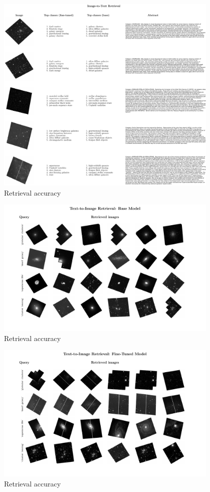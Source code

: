 \documentclass[10pt]{article} %
\begin{document}
\begin{figure}[!h]
\includegraphics[width=0.95\textwidth]{plots/itt.pdf}
\caption{Retrieval accuracy}
\label{fig:itt}
\end{figure}

\begin{figure}[!h]
\includegraphics[width=0.95\textwidth]{plots/tti_base.pdf}
\caption{Retrieval accuracy}
\label{fig:tti}
\end{figure}

\begin{figure}[!h]
\includegraphics[width=0.95\textwidth]{plots/tti.pdf}
\caption{Retrieval accuracy}
\label{fig:tti_base}
\end{figure}
\end{document}
